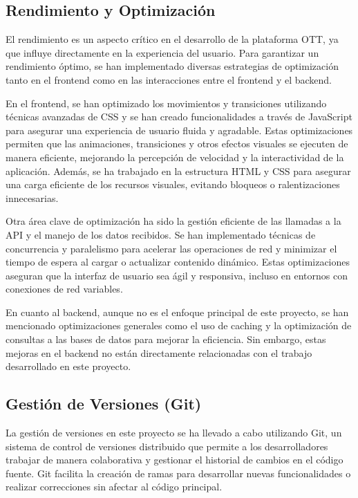 \subsection{Rendimiento y Optimización}
\label{subsec:rendimiento_optimizacion}

El rendimiento es un aspecto crítico en el desarrollo de la plataforma OTT, ya que influye directamente 
en la experiencia del usuario. Para garantizar un rendimiento óptimo, se han implementado diversas estrategias 
de optimización tanto en el frontend como en las interacciones entre el frontend y el backend.

En el frontend, se han optimizado los movimientos y transiciones utilizando técnicas avanzadas de CSS y se han 
creado funcionalidades a través de JavaScript para asegurar una experiencia de usuario fluida y agradable. Estas 
optimizaciones permiten que las animaciones, transiciones y otros efectos visuales se ejecuten de manera eficiente, 
mejorando la percepción de velocidad y la interactividad de la aplicación. Además, se ha trabajado en la estructura 
HTML y CSS para asegurar una carga eficiente de los recursos visuales, evitando bloqueos o ralentizaciones innecesarias.

Otra área clave de optimización ha sido la gestión eficiente de las llamadas a la API y el manejo de los datos 
recibidos. Se han implementado técnicas de concurrencia y paralelismo para acelerar las operaciones de red y 
minimizar el tiempo de espera al cargar o actualizar contenido dinámico. Estas optimizaciones aseguran que la 
interfaz de usuario sea ágil y responsiva, incluso en entornos con conexiones de red variables.

En cuanto al backend, aunque no es el enfoque principal de este proyecto, se han mencionado optimizaciones 
generales como el uso de caching y la optimización de consultas a las bases de datos para mejorar la eficiencia. 
Sin embargo, estas mejoras en el backend no están directamente relacionadas con el trabajo desarrollado en este proyecto.


\subsection{Gestión de Versiones (Git)}
\label{subsec:gestion_versiones}

La gestión de versiones en este proyecto se ha llevado a cabo utilizando Git, un sistema de control de versiones 
distribuido que permite a los desarrolladores trabajar de manera colaborativa y gestionar el historial de cambios 
en el código fuente. Git facilita la creación de ramas para desarrollar nuevas funcionalidades o realizar correcciones 
sin afectar al código principal.

